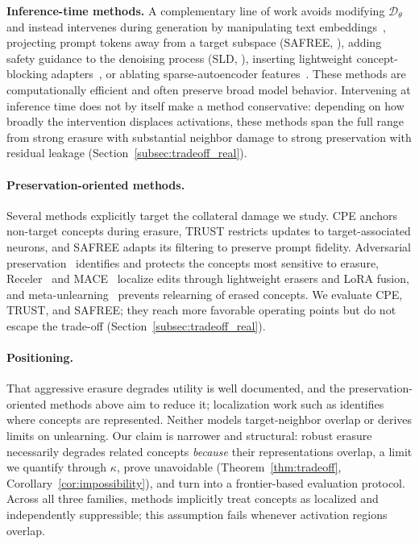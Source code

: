 \textbf{Inference-time methods.}
A complementary line of work avoids modifying $\mathcal{D}_{\theta}$ and instead intervenes during generation by manipulating text embeddings~\citep{li2024get}, projecting prompt tokens away from a target subspace (SAFREE, \citealp{yoon2025safree}), adding safety guidance to the denoising process (SLD, \citealp{schramowski2023safe}), inserting lightweight concept-blocking adapters~\citep{lyu2024one}, or ablating sparse-autoencoder features~\citep{cywinski2025saeuron}. These methods are computationally efficient and often preserve broad model behavior. Intervening at inference time does not by itself make a method conservative: depending on how broadly the intervention displaces activations, these methods span the full range from strong erasure with substantial neighbor damage to strong preservation with residual leakage (Section~\ref{subsec:tradeoff_real}).

\paragraph{Preservation-oriented methods.} Several methods explicitly target the collateral damage we study. CPE anchors non-target concepts during erasure, TRUST restricts updates to target-associated neurons, and SAFREE adapts its filtering to preserve prompt fidelity. Adversarial preservation~\citep{bui2024erasing} identifies and protects the concepts most sensitive to erasure, Receler~\citep{huang2024receler} and MACE~\citep{lu2024mace} localize edits through lightweight erasers and LoRA fusion, and meta-unlearning~\citep{gao2025meta} prevents relearning of erased concepts. We evaluate CPE, TRUST, and SAFREE; they reach more favorable operating points but do not escape the trade-off (Section~\ref{subsec:tradeoff_real}).

\paragraph{Positioning.} That aggressive erasure degrades utility is well
documented, and the preservation-oriented methods above aim to reduce it;
localization work such as \citet{zarei2026localizing} identifies where concepts
are represented. Neither models target-neighbor overlap or derives limits on
unlearning. Our claim is narrower and structural: robust erasure necessarily
degrades related concepts \emph{because} their representations overlap, a limit
we quantify through $\kappa$, prove unavoidable (Theorem~\ref{thm:tradeoff},
Corollary~\ref{cor:impossibility}), and turn into a frontier-based evaluation
protocol. Across all three families, methods implicitly treat concepts as
localized and independently suppressible; this assumption fails whenever
activation regions overlap.

